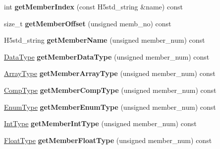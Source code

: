 \begin{DoxyCompactItemize}
int {\bfseries get\+Member\+Index} (const H5std\+\_\+string \&name) const
\item 
\mbox{\label{class_h5_1_1_comp_type_a5c5f63a87ba09215616b0a3e5202d935}} 
size\+\_\+t {\bfseries get\+Member\+Offset} (unsigned memb\+\_\+no) const
\item 
\mbox{\label{class_h5_1_1_comp_type_a8148f2cd2b761f711b1a4ef1dc3b5f1f}} 
H5std\+\_\+string {\bfseries get\+Member\+Name} (unsigned member\+\_\+num) const
\item 
\mbox{\label{class_h5_1_1_comp_type_afa38359a984ee4246f53fa42f214fd67}} 
\hyperlink{class_h5_1_1_data_type}{Data\+Type} {\bfseries get\+Member\+Data\+Type} (unsigned member\+\_\+num) const
\item 
\mbox{\label{class_h5_1_1_comp_type_a771e859b35902168305b6480223da278}} 
\hyperlink{class_h5_1_1_array_type}{Array\+Type} {\bfseries get\+Member\+Array\+Type} (unsigned member\+\_\+num) const
\item 
\mbox{\label{class_h5_1_1_comp_type_a0c8611eb67938e51af6f3eb97bc43f39}} 
\hyperlink{class_h5_1_1_comp_type}{Comp\+Type} {\bfseries get\+Member\+Comp\+Type} (unsigned member\+\_\+num) const
\item 
\mbox{\label{class_h5_1_1_comp_type_a14f4d70c2b66c6fa79110e2d59801752}} 
\hyperlink{class_h5_1_1_enum_type}{Enum\+Type} {\bfseries get\+Member\+Enum\+Type} (unsigned member\+\_\+num) const
\item 
\mbox{\label{class_h5_1_1_comp_type_a3b07df22e0dba85da9ac28ef641028d8}} 
\hyperlink{class_h5_1_1_int_type}{Int\+Type} {\bfseries get\+Member\+Int\+Type} (unsigned member\+\_\+num) const
\item 
\mbox{\label{class_h5_1_1_comp_type_a03fca3823e37761893510ea6a7abe183}} 
\hyperlink{class_h5_1_1_float_type}{Float\+Type} {\bfseries get\+Member\+Float\+Type} (unsigned member\+\_\+num) const
\item 
\mbox{\label{class_h5_1_1_comp_type_a1160cfbb4b058ff11ed7762e6a51954d}} 

\end{DoxyCompactItemize}
